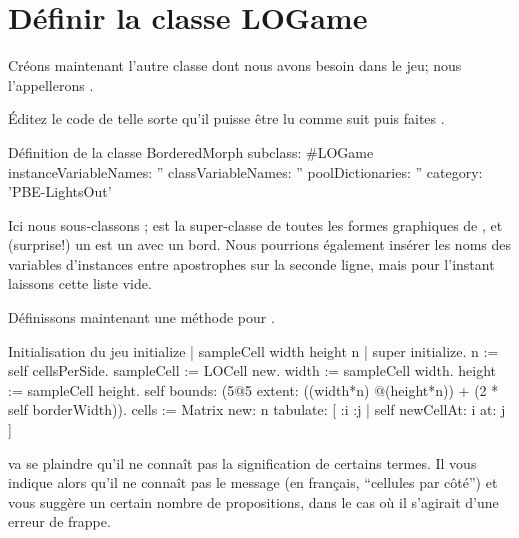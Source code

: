 \documentclass[a4paper,10pt,twoside]{book}
\begin{document}

\section{Définir la classe LOGame}

Créons maintenant l'autre classe dont nous avons besoin dans le jeu; nous l'appellerons .

Éditez le code de telle sorte qu'il puisse \^etre lu comme suit puis faites .

\begin{classdef}[sbegame]{Définition de la classe }
BorderedMorph subclass: #LOGame
   instanceVariableNames: ''
   classVariableNames: ''
   poolDictionaries: ''
   category: 'PBE-LightsOut'
\end{classdef}

Ici nous sous-classons ;  est la
super-classe de toutes les formes graphiques de \pharo, et (surprise!)
un  est un  avec un bord.  
Nous pourrions également insérer les noms des variables d'instances
entre apostrophes sur la seconde ligne, mais pour l'instant 
laissons cette liste vide.

Définissons maintenant une méthode  pour .


\begin{numMethod}[sbegameinitialize]{Initialisation du jeu}
initialize
   | sampleCell width height n |
   super initialize.
   n := self cellsPerSide.
   sampleCell := LOCell new.
   width := sampleCell width.
   height := sampleCell height.
   self bounds: (5@5 extent: ((width*n) @(height*n)) + (2 * self borderWidth)).
   cells := Matrix new: n tabulate: [ :i :j | self newCellAt: i at: j ]
\end{numMethod}


\pharo va se plaindre qu'il ne conna\^it pas la signification de
certains termes.
Il vous indique alors qu'il ne conna\^it pas le message
 (en fran\c{c}ais, ``cellules par c\^oté'') et
vous suggère un certain nombre de propositions, dans le cas o\`u il
s'agirait d'une erreur de frappe.
\end{document}
